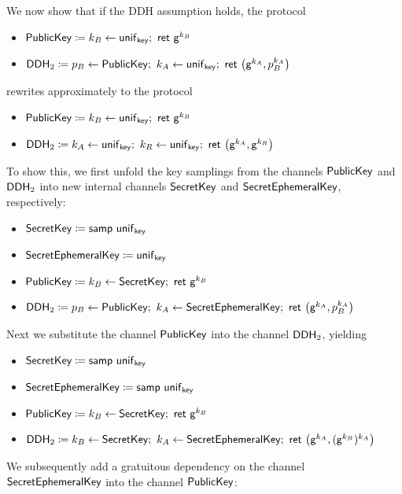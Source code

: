 \noindent We now show that if the DDH assumption holds, the protocol
\begin{itemize}
\item $\mathsf{PublicKey} \coloneqq k_B \leftarrow \mathsf{unif}_{\mathsf{key}}; \ \mathsf{ret} \ \mathsf{g}^{k_B}$
\item $\mathsf{DDH}_2 \coloneqq p_B \leftarrow \mathsf{PublicKey}; \ k_A \leftarrow \mathsf{unif}_{\mathsf{key}}; \ \mathsf{ret} \ \big(\mathsf{g}^{k_A}, p_B^{k_A}\big)$
\end{itemize}
rewrites approximately to the protocol
\begin{itemize}
\item $\mathsf{PublicKey} \coloneqq k_B \leftarrow \mathsf{unif}_{\mathsf{key}}; \ \mathsf{ret} \ \mathsf{g}^{k_B}$
\item $\mathsf{DDH}_2 \coloneqq k_A \leftarrow \mathsf{unif}_{\mathsf{key}}; \ k_R \leftarrow \mathsf{unif}_{\mathsf{key}}; \ \mathsf{ret} \ \big(\mathsf{g}^{k_A}, \mathsf{g}^{k_R}\big)$
\end{itemize}

\noindent To show this, we first unfold the key samplings from the channels $\mathsf{PublicKey}$ and $\mathsf{DDH}_2$ into new internal channels $\mathsf{SecretKey}$ and $\mathsf{SecretEphemeralKey}$, respectively:

\begin{itemize}
\item {\color{red} $\mathsf{SecretKey} \coloneqq \mathsf{samp} \ \mathsf{unif}_{\mathsf{key}}$}
\item {\color{red} $\mathsf{SecretEphemeralKey} \coloneqq \mathsf{unif}_{\mathsf{key}}$}
\item $\mathsf{PublicKey} \coloneqq k_B \leftarrow \mathsf{SecretKey}; \ \mathsf{ret} \ \mathsf{g}^{k_B}$
\item {\color{red} $\DDH_2 \coloneqq p_B \leftarrow \PublicKey; \ k_A \leftarrow \SecretEphemeralKey; \ \ret{\big(\gen^{k_A}, p_B^{k_A}\big)}$}
\end{itemize}

\noindent Next we substitute the channel $\mathsf{PublicKey}$ into the channel $\mathsf{DDH}_2$, yielding

\begin{itemize}
\item $\mathsf{SecretKey} \coloneqq \mathsf{samp} \ \mathsf{unif}_{\mathsf{key}}$
\item $\mathsf{SecretEphemeralKey} \coloneqq \mathsf{samp} \ \mathsf{unif}_{\mathsf{key}}$
\item $\mathsf{PublicKey} \coloneqq k_B \leftarrow \mathsf{SecretKey}; \ \mathsf{ret} \ \mathsf{g}^{k_B}$
\item {\color{red} $\DDH_2 \coloneqq k_B \leftarrow \SecretKey; \ k_A \leftarrow \SecretEphemeralKey; \ \ret{\big(\gen^{k_A}, (\gen^{k_B})^{k_A}\big)}$}
\end{itemize}

\noindent We subsequently add a gratuitous dependency on the channel $\mathsf{SecretEphemeralKey}$ into the channel $\mathsf{PublicKey}$:

